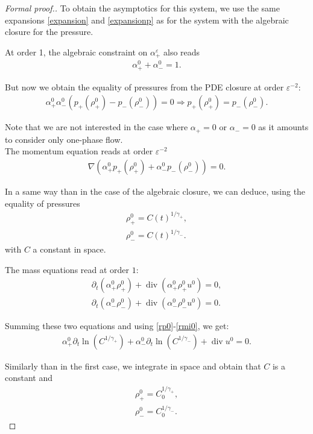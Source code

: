 \documentclass[11pt, twoside, a4paper]{article}
\theoremstyle{plain}
\theoremstyle{remark}
\numberwithin{equation}{section}
\renewcommand{\div}{\operatorname{div}}
\newcommand{\dt}{\partial_t}
\newcommand{\eps}{\varepsilon}
\newcommand{\ap}{\alpha_+}
\newcommand{\am}{\alpha_-}
\newcommand{\rp}{\rho_+}
\newcommand{\rmi}{\rho_-}
\begin{document}
\begin{proof} [Formal proof.]

To obtain the asymptotics for this system, we use the same expansions \eqref{expansion} and \eqref{expansionp} as for the system with the algebraic closure for the pressure.

At order 1, the algebraic constraint on $\ap^\eps$ also reads
\begin{align*}
    \alpha_+^0 + \alpha_-^0 = 1. 
\end{align*}

But now we obtain the equality of pressures from the PDE closure at order $\eps^{-2}$:
\begin{align*}
    \ap^0 \am^0 (p_+(\rp^0) - p_-(\rmi^0)) =0 \Rightarrow p_+(\rp^0) = p_-(\rmi^0).
\end{align*}

Note that we are not interested in the case where $\ap =0$ or $\am=0$ as it amounts to consider only one-phase flow.\\

The momentum equation reads at order $\eps^{-2}$
\begin{align*}
    \nabla (\alpha_+^{0}p_+(\rho_+^0)+\alpha_-^0p_-(\rho_-^0)) =0. \nonumber
\end{align*}

In a same way than in the case of the algebraic closure, we can deduce, using the equality of pressures
\begin{align}
    \rho_+^0 = C(t)^{1/\gamma_+},\label{rp0}\\
    \rho_-^0 = C(t)^{1/\gamma_-}.\label{rmi0}
\end{align}
with $C$ a constant in space.

The mass equations read at order $1$:
\begin{align*}
    \dt (\alpha_+^0 \rho_+^0) + \div (\alpha_+^0 \rho_+^0 u^0) = 0,\\
    \dt (\alpha_-^0 \rho_-^0) + \div (\alpha_-^0 \rho_-^0 u^0) = 0.
\end{align*}

Summing these two equations and using \eqref{rp0}-\eqref{rmi0}, we get:
\begin{align}
    \alpha_+^0 \dt \ln (C^{1/\gamma_+}) + \alpha_-^0 \dt \ln(C^{1/\gamma_-}) + \div u^0 = 0.\label{fordivu2}
\end{align}

Similarly than in the first case, we integrate in space and obtain that $C$ is a constant and
\begin{align*}
    \rho_+^0 = C_0^{1/\gamma_+},\\
    \rho_-^0 = C_0^{1/\gamma_-}.
\end{align*}


\end{proof}
\end{document}
